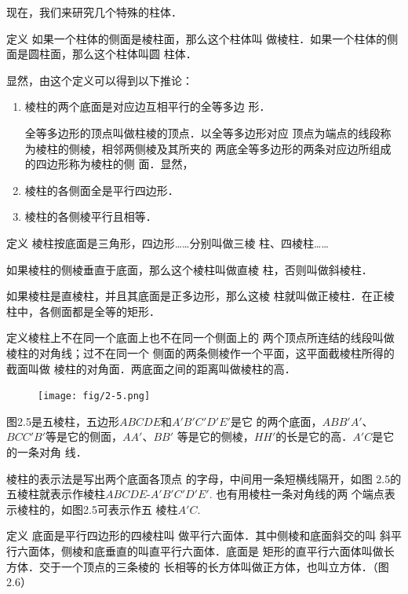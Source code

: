 现在，我们来研究几个特殊的柱体．

\begin{blk}{定义} 
    如果一个柱体的侧面是棱柱面，那么这个柱体叫
做棱柱．如果一个柱体的侧面是圆柱面，那么这个柱体叫圆
柱体．    
\end{blk}

显然，由这个定义可以得到以下推论：
\begin{enumerate}
\item 棱柱的两个底面是对应边互相平行的全等多边
形．

全等多边形的顶点叫做柱棱的顶点．以全等多边形对应
顶点为端点的线段称为棱柱的侧棱，相邻两侧棱及其所夹的
两底全等多边形的两条对应边所组成的四边形称为棱柱的侧
面．显然，
\item 棱柱的各侧面全是平行四边形．
\item 棱柱的各侧棱平行且相等．
\end{enumerate}


\begin{blk}{定义}
    棱柱按底面是三角形，四边形……分别叫做三棱
柱、四棱柱……

如果棱柱的侧棱垂直于底面，那么这个棱柱叫做直棱
柱，否则叫做斜棱柱．

如果棱柱是直棱柱，并且其底面是正多边形，那么这棱
柱就叫做正棱柱．在正棱柱中，各侧面都是全等的矩形．
\end{blk}
 
\begin{blk}
    {定义}棱柱上不在同一个底面上也不在同一个侧面上的
两个顶点所连结的线段叫做棱柱的对角线；过不在同一个
侧面的两条侧棱作一个平面，这平面截棱柱所得的截面叫做
棱柱的对角面．两底面之间的距离叫做棱柱的高．
\end{blk}

\begin{figure}[htp]
    \centering
\texttt{[image: fig/2-5.png]}
    \caption{}
\end{figure}

图2.5是五棱柱，五边形$ABCDE$和$A'B'C'D'E'$是它
的两个底面，$ABB'A'$、$BCC'B'$等是它的侧面，$AA'$、$BB'$
等是它的侧棱，$HH'$的长是它的高．$A'C$是它的一条对角
线．

棱柱的表示法是写出两个底面各顶点
的字母，中间用一条短横线隔开，如图
2.5的五棱柱就表示作棱柱$ABCDE$-$A'
B'C'D'E'$. 也有用棱柱一条对角线的两
个端点表示棱柱的，如图2.5可表示作五
棱柱$A'C$. 

\begin{blk}{定义} 
    底面是平行四边形的四棱柱叫
    做平行六面体．其中侧棱和底面斜交的叫
    斜平行六面体，侧棱和底垂直的叫直平行六面体．底面是
    矩形的直平行六面体叫做长方体．交于一个顶点的三条棱的
    长相等的长方体叫做正方体，也叫立方体．（图2.6）
\end{blk}

